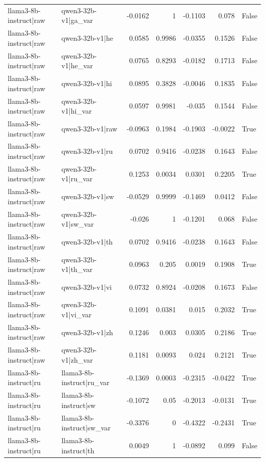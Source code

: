 \begin{table}
\begin{tabular}{l l r r r r l}
llama3-8b-instruct|raw & qwen3-32b-v1|ga_var & -0.0162 & 1 & -0.1103 & 0.078 & False \\
llama3-8b-instruct|raw & qwen3-32b-v1|he & 0.0585 & 0.9986 & -0.0355 & 0.1526 & False \\
llama3-8b-instruct|raw & qwen3-32b-v1|he_var & 0.0765 & 0.8293 & -0.0182 & 0.1713 & False \\
llama3-8b-instruct|raw & qwen3-32b-v1|hi & 0.0895 & 0.3828 & -0.0046 & 0.1835 & False \\
llama3-8b-instruct|raw & qwen3-32b-v1|hi_var & 0.0597 & 0.9981 & -0.035 & 0.1544 & False \\
llama3-8b-instruct|raw & qwen3-32b-v1|raw & -0.0963 & 0.1984 & -0.1903 & -0.0022 & True \\
llama3-8b-instruct|raw & qwen3-32b-v1|ru & 0.0702 & 0.9416 & -0.0238 & 0.1643 & False \\
llama3-8b-instruct|raw & qwen3-32b-v1|ru_var & 0.1253 & 0.0034 & 0.0301 & 0.2205 & True \\
llama3-8b-instruct|raw & qwen3-32b-v1|sw & -0.0529 & 0.9999 & -0.1469 & 0.0412 & False \\
llama3-8b-instruct|raw & qwen3-32b-v1|sw_var & -0.026 & 1 & -0.1201 & 0.068 & False \\
llama3-8b-instruct|raw & qwen3-32b-v1|th & 0.0702 & 0.9416 & -0.0238 & 0.1643 & False \\
llama3-8b-instruct|raw & qwen3-32b-v1|th_var & 0.0963 & 0.205 & 0.0019 & 0.1908 & True \\
llama3-8b-instruct|raw & qwen3-32b-v1|vi & 0.0732 & 0.8924 & -0.0208 & 0.1673 & False \\
llama3-8b-instruct|raw & qwen3-32b-v1|vi_var & 0.1091 & 0.0381 & 0.015 & 0.2032 & True \\
llama3-8b-instruct|raw & qwen3-32b-v1|zh & 0.1246 & 0.003 & 0.0305 & 0.2186 & True \\
llama3-8b-instruct|raw & qwen3-32b-v1|zh_var & 0.1181 & 0.0093 & 0.024 & 0.2121 & True \\
llama3-8b-instruct|ru & llama3-8b-instruct|ru_var & -0.1369 & 0.0003 & -0.2315 & -0.0422 & True \\
llama3-8b-instruct|ru & llama3-8b-instruct|sw & -0.1072 & 0.05 & -0.2013 & -0.0131 & True \\
llama3-8b-instruct|ru & llama3-8b-instruct|sw_var & -0.3376 & 0 & -0.4322 & -0.2431 & True \\
llama3-8b-instruct|ru & llama3-8b-instruct|th & 0.0049 & 1 & -0.0892 & 0.099 & False \\

\end{tabular}
\end{table}
